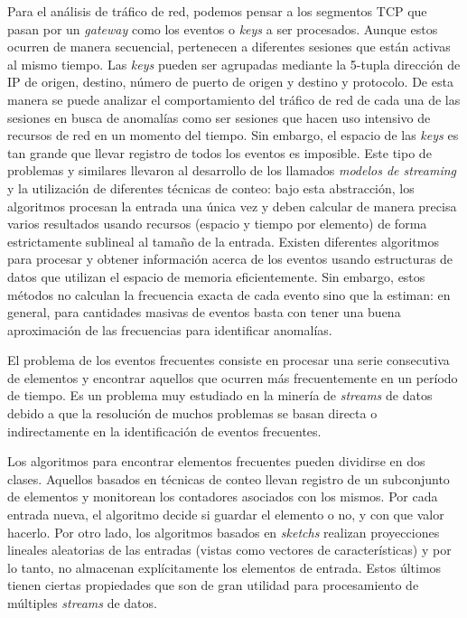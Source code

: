 \documentclass[a4paper,10pt, oneside]{article}
\begin{document}
Para el análisis de tráfico de red, podemos pensar a los segmentos TCP que pasan por un \textit{gateway} como los eventos o \textit{keys} a ser procesados. Aunque estos ocurren de manera secuencial, pertenecen a diferentes sesiones que están activas al mismo tiempo. Las \textit{keys} pueden ser agrupadas mediante la 5-tupla dirección de IP de origen, destino, número de puerto de origen y destino y protocolo. De esta manera se puede analizar el comportamiento del tráfico de red de cada una de las sesiones en busca de anomalías como ser sesiones que hacen uso intensivo de recursos de red en un momento del tiempo. Sin embargo, el espacio de las \textit{keys} es tan grande que llevar registro de todos los eventos es imposible. Este tipo de problemas y similares llevaron al desarrollo de los llamados \textit{modelos de streaming} y la utilización de diferentes técnicas de conteo: bajo esta abstracción, los algoritmos procesan la entrada una única vez y deben calcular de manera precisa varios resultados usando recursos (espacio y tiempo por elemento) de forma estrictamente sublineal al tamaño de la entrada\cite{Muthukrishnan:2005:DSA:1166409.1166410}. Existen diferentes algoritmos para procesar y obtener información acerca de los eventos usando estructuras de datos que utilizan el espacio de memoria eficientemente. Sin embargo, estos métodos no calculan la frecuencia exacta de cada evento sino que la estiman: en general, para cantidades masivas de eventos basta con tener una buena aproximación de las frecuencias para identificar anomalías.

El problema de los eventos frecuentes consiste en procesar una serie consecutiva de elementos y encontrar aquellos que ocurren más frecuentemente en un período de tiempo. Es un problema muy estudiado en la minería de \textit{streams} de datos debido a que la resolución de muchos problemas se basan directa o indirectamente en la identificación de eventos frecuentes.

Los algoritmos para encontrar elementos frecuentes pueden dividirse en dos clases. Aquellos basados en técnicas de conteo llevan registro de un subconjunto de elementos y monitorean los contadores asociados con los mismos. Por cada entrada nueva, el algoritmo decide si guardar el elemento o no, y con que valor hacerlo. Por otro lado, los algoritmos basados en \textit{sketchs} realizan proyecciones lineales aleatorias de las entradas\cite{Cormode:2008:FFI:1454159.1454225} (vistas como vectores de características) y por lo tanto, no almacenan explícitamente los elementos de entrada. Estos últimos tienen ciertas propiedades que son de gran utilidad para procesamiento de múltiples \textit{streams} de datos.
\end{document}
